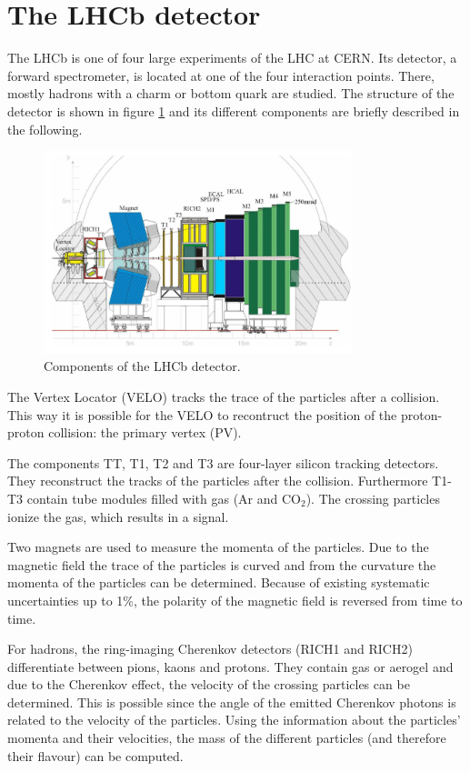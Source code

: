 \section{The LHCb detector}

The LHCb is one of four large experiments of the LHC at CERN. Its detector, a forward spectrometer, is located at one of the four interaction points.
There, mostly hadrons with a charm or bottom quark are studied.
The structure of the detector is shown in figure \ref{fig:lhcb} and its different components are briefly described in the following.

\begin{figure}[!htb]
  \centering
  \includegraphics[width=0.8\textwidth]{graphics/lhcb.png}
  \caption{Components of the LHCb detector. \cite{lhcb}}
  \label{fig:lhcb}
\end{figure}

The Vertex Locator (VELO) tracks the trace of the particles after a collision. This way it is possible for the VELO to recontruct the position of the proton-proton collision: the primary vertex (PV).

The components TT, T1, T2 and T3 are four-layer silicon tracking detectors. They reconstruct the tracks of the particles after the collision. Furthermore T1-T3 contain tube modules filled with gas (Ar and $\text{CO}_2$). The crossing particles ionize the gas, which results in a signal.

Two magnets are used to measure the momenta of the particles. Due to the magnetic field the trace of the particles is curved and from the curvature the momenta of the particles can be determined. Because of existing systematic uncertainties up to 1\%, the polarity of the magnetic field is reversed from time to time.

For hadrons, the ring-imaging Cherenkov detectors (RICH1 and RICH2) differentiate between pions, kaons and protons. They contain gas or aerogel and due to the Cherenkov effect, the velocity of the crossing particles can be determined. This is possible since the angle of the emitted Cherenkov photons is related to the velocity of the particles.
Using the information about the particles' momenta and their velocities, the mass of the different particles (and therefore their flavour) can be computed.

